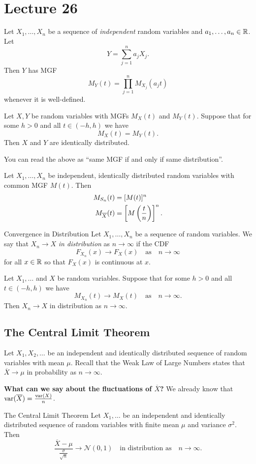 \documentclass[class=article, crop=false]{standalone}
\begin{document}
  \section{Lecture 26}
  \begin{theorem}{}
    Let $X_1,\dotsc,X_n$ be a sequence of \emph{independent} random variables and $a_1,\dotsc,a_n\in\mathbb{R}$. Let
    \[
      Y = \sum_{j=1}^{n}a_jX_j.
    \]
    Then $Y$ has MGF
    \[
      M_Y(t) = \prod_{j=1}^{n}M_{X_j}(a_jt)
    \]
    whenever it is well-defined.
  \end{theorem}
  \begin{theorem}{}
    Let $X, Y$ be random variables with MGFs $M_X(t)$ and $M_Y(t)$. Suppose that for some $h > 0$ and all $t\in (-h, h)$ we have
    \[
      M_X(t) = M_Y(t).
    \]
    Then $X$ and $Y$ are identically distributed.
  \end{theorem}
  \begin{note}{}
    You can read the above as ``same MGF if and only if same distribution''.
  \end{note}
  \begin{theorem}{}
    Let $X_1,\dotsc,X_n$ be independent, identically distributed random variables with common MGF $M(t)$. Then
    \begin{align*}
      M_{S_n}(t) &= [M(t)]^n \\
      M_{\overline{X}}(t) &= \left[M\left( \frac{t}{n} \right)\right]^n.
    \end{align*}
  \end{theorem}
  \begin{definition}{Convergence in Distribution}
    Let $X_1,\dotsc,X_n$ be a sequence of random variables. We say that $X_n\to X$ \emph{in distribution} as $n\to\infty$ if the CDF
    \[
      F_{X_n}(x)\to F_X(x)\quad\text{as}\quad n\to\infty
    \]
    for all $x\in\mathbb{R}$ so that $F_X(x)$ is continuous at $x$.
  \end{definition}
  \begin{theorem}{}
    Let $X_1,\dotsc$ and $X$ be random variables. Suppose that for some $h > 0$ and all $t\in (-h, h)$ we have
    \[
      M_{X_n}(t)\to M_X(t)\quad\text{as}\quad n\to\infty.
    \]
    Then $X_n\to X$ in distribution as $n\to\infty$.
  \end{theorem}
  \subsection{The Central Limit Theorem}
  Let $X_1,X_2,\dotsc$ be an independent and identically distributed sequence of random variables with mean $\mu$. Recall that the Weak Law of Large Numbers states that $\overline X\to \mu$ in probability as $n\to\infty$. \par
  \textbf{What can we say about the fluctuations of $\overline X$?} We already know that $\operatorname{var}(\overline X) = \frac{\operatorname{var}(X)}{n}$.
  \begin{theorem}{The Central Limit Theorem}
    Let $X_1,\dotsc$ be an independent and identically distributed sequence of random variables with finite mean $\mu$ and variance $\sigma^2$. Then
    \[
      \frac{\overline X - \mu}{\frac{\sigma}{\sqrt{n}}}\to \mathcal{N}(0, 1)\quad\text{in distribution as}\quad n\to\infty.
    \]
  \end{theorem}
\end{document}
